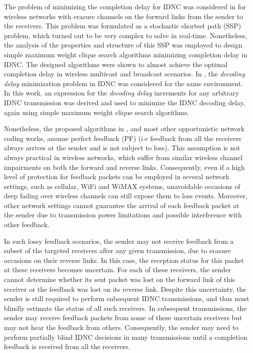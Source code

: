 \documentclass[10pt,jounral]{IEEEtran}
\begin{document}
The problem of minimizing the completion delay for IDNC was considered in \cite{ICC10,TON10-CD} for wireless networks with erasure channels on the forward links from the sender to the receivers. This problem was formulated as a stochastic shortest path (SSP) problem, which turned out to be very complex to solve in real-time. Nonetheless, the analysis of the properties and structure of this SSP was employed to design simple maximum weight clique search algorithms minimizing completion delay in IDNC. The designed algorithms were shown to almost achieve the optimal completion delay in wireless multicast and broadcast scenarios. In \cite{GC10}, the \emph{decoding delay} minimization problem in IDNC was considered for the same environment. In this work, an expression for the \emph{decoding delay} increments for any arbitrary IDNC transmission was derived and used to minimize the IDNC decoding delay, again using simple maximum weight clique search algorithms.

Nonetheless, the proposed algorithms in \cite{ICC10,TON10-CD,GC10}, and most other opportunistic network coding works, assume perfect feedback (PF) (i.e feedback from all the receivers always arrives at the sender and is not subject to loss). This assumption is not always practical in wireless networks, which suffer from similar wireless channel impairments on both the forward and reverse links. Consequently, even if a high level of protection for feedback packets can be employed in several network settings, such as cellular, WiFi and WiMAX systems, unavoidable occasions of deep fading over wireless channels can still expose them to loss events. Moreover, other network settings cannot guarantee the arrival of each feedback packet at the sender due to transmission power limitations and possible interference with other feedback.

In such lossy feedback scenarios, the sender may not receive feedback from a subset of the targeted receivers after any given transmission, due to erasure occasions on their reverse links. In this case, the reception status for this packet at these receivers becomes uncertain. For each of these receivers, the sender cannot determine whether its sent packet was lost on the forward link of this receiver or the feedback was lost on its reverse link. Despite this uncertainty, the sender is still required to perform subsequent IDNC transmissions, and thus must blindly estimate the status of all such receivers. In subsequent transmissions, the sender may receive feedback packets from some of these uncertain receivers but may not hear the feedback from others. Consequently, the sender may need to perform partially blind IDNC decisions in many transmissions until a completion feedback is received from all the receivers.
\end{document}
